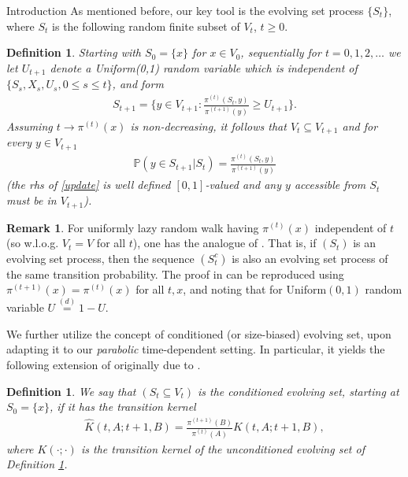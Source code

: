 \documentclass[12pt,reqno]{amsart}
\numberwithin{equation}{section}
\newtheorem{defn}[thm]{Definition}
\theoremstyle{definition}
\newtheorem{remark}[thm]{Remark}
\begin{document}
\begin{section}{Introduction}
As mentioned before, our key tool is the evolving set process $\{S_t\}$,
where $S_t$ is the following random finite subset of $V_t$, $t \ge 0$. 
\begin{defn}\label{defn-evol}
Starting with $S_0=\{x\}$ for $x \in V_0$, sequentially 
for $t=0,1,2,\ldots$ we let $U_{t+1}$ denote a 
Uniform(0,1) random variable which is 
independent of $\{S_s,X_s,U_s,  0 \le s \le t\}$, and form
\begin{align*}
S_{t+1}=\{y \in V_{t+1} : \frac{\pi^{(t)}(S_t,y)}{\pi^{(t+1)}(y)}\ge U_{t+1}\}.
\end{align*}
Assuming $t\to\pi^{(t)}(x)$ is non-decreasing, it 
follows that $V_t \subseteq V_{t+1}$ and for every $y\in V_{t+1}$
\begin{align}
\mathbb{P}(y\in S_{t+1}|S_t)=\frac{\pi^{(t)}(S_t,y)}{\pi^{(t+1)}(y)} \label{update}
\end{align}
(the {{\sc\lowercase{{RHS}}}} of \eqref{update} is well defined $[0,1]$-valued 
and any $y$ accessible from $S_t$ must be in $V_{t+1}$).
\end{defn}

\begin{remark}\label{rem:comp}
For uniformly lazy random walk having $\pi^{(t)}(x)$ independent of $t$ 
(so w.l.o.g. $V_t=V$ for all $t$), 
one has the analogue of \cite[Lemma 8]{MP2}. That is, if $(S_t)$ is 
an evolving set process, then the sequence $(S_t^c)$ is also an evolving set 
process of the same transition probability. The proof in \cite[pg 253]{MP2} 
can be reproduced using $\pi^{(t+1)}(x)=\pi^{(t)}(x)$ for all $t,x$, and 
noting that for Uniform$(0,1)$ random variable $U \stackrel{(d)}{=} 1-U$.
\end{remark}

\medskip
We further utilize the concept of conditioned (or size-biased) evolving set, 
upon adapting it to our \emph{parabolic} time-dependent setting.
In particular, it yields the following extension of 
\cite[Theorem 17.23]{LPW} originally due to \cite{DF}.
\begin{defn}\label{defn-DF-evol}
We say that $(S_t \subseteq V_t)$ is the conditioned evolving set, starting 
at $S_0=\{x\}$, if it has the transition kernel
\begin{align}\label{eq:whK-def}
\widehat{K}(t,A;t+1,B)=\frac{\pi^{(t+1)}(B)}{\pi^{(t)}(A)}K(t,A;t+1,B),
\end{align}
where $K(\cdot;\cdot)$ is the transition kernel of 
the unconditioned evolving set of Definition \ref{defn-evol}. 
\end{defn}


\end{section}
\end{document}
